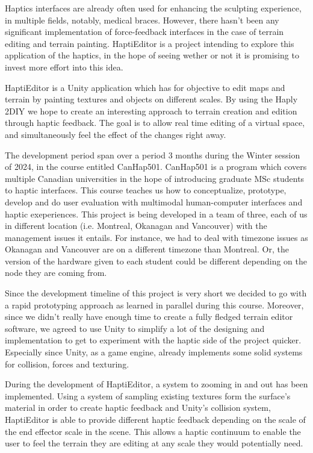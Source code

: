 Haptics interfaces are already often used for enhancing the sculpting experience, in multiple fields, notably, medical braces.
However, there hasn't been any significant implementation of force-feedback interfaces in the case of terrain editing and terrain painting.
HaptiEditor is a project intending to explore this application of the haptics, in the hope of seeing wether or not it is promising to invest more effort into this idea.

HaptiEditor is a Unity application which has for objective to edit maps and terrain by painting textures and objects on different scales. 
By using the Haply 2DIY we hope to create an interesting approach to terrain creation and edition through haptic feedback.
The goal is to allow real time editing of a virtual space, and simultaneously feel the effect of the changes right away.

The development period span over a period 3 months during the Winter session of 2024, in the course entitled CanHap501.
CanHap501 is a program which covers multiple Canadian universities in the hope of introducing graduate MSc students to haptic interfaces. 
This course teaches us how to conceptualize, prototype, develop and do user evaluation with multimodal human-computer interfaces and haptic exeperiences.
This project is being developed in a team of three, each of us in different location (i.e. Montreal, Okanagan and Vancouver) with the management issues it entails. 
For instance, we had to deal with timezone issues as Okanagan and Vancouver are on a different timezone than Montreal. 
Or, the version of the hardware given to each student could be different depending on the node they are coming from.

Since the development timeline of this project is very short we decided to go with a rapid prototyping approach as learned in parallel during this course.
Moreover, since we didn't really have enough time to create a fully fledged terrain editor software,
we agreed to use Unity to simplify a lot of the designing and implementation to get to experiment with the haptic side of the project quicker.
Especially since Unity, as a game engine, already implements some solid systems for collision, forces and texturing.

During the development of HaptiEditor, a system to zooming in and out has been implemented. 
Using a system of sampling existing textures form the surface's material in order to create haptic feedback and Unity's collision system, HaptiEditor is able to provide different haptic feedback depending on the scale of the end effector scale in the scene.
This allows a haptic continuum to enable the user to feel the terrain they are editing at any scale they would potentially need.

